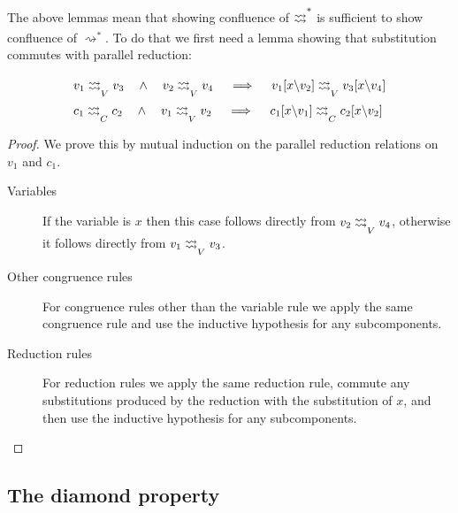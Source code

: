 \documentclass[acmsmall, screen, review, anonymous]{acmart}
\makeatletter
\theoremstyle{definition}
\newcommand{\sub}[2]{[#1\backslash#2]}
\newcommand{\sbst}[3]{#1\sub{#2}{#3}}
\newcommand{\stepstoname}{\rightsquigarrow}
\newcommand{\reducestoname}{\stepstoname^{*}}
\newcommand{\drightsquigarrow}{\begin{array}{@{}c@{}}\rightsquigarrow \\[-8pt] \rightsquigarrow\end{array}}
\newcommand{\parastepstoname}{\drightsquigarrow}
\newcommand{\parastepstov}{\mathrel{\parastepstoname_{V}}}
\newcommand{\parastepstoc}{\mathrel{\parastepstoname_{C}}}
\newcommand{\parareducestoname}{\parastepstoname^{*}}
\makeatother
\begin{document}
The above lemmas mean that showing confluence of $\parareducestoname$ is
sufficient to show confluence of $\reducestoname$. To do that we first
need a lemma showing that substitution commutes with parallel reduction:
\begin{lemma}
\label{lemma:subst-of-parallel-reduction}
  \begin{align*}
  &v_1 \parastepstov v_3
    \quad \wedge \quad v_2 \parastepstov v_4
    \quad \implies \quad \sbst{v_1}{x}{v_2} \parastepstov \sbst{v_3}{x}{v_4} \\
  &c_1 \parastepstoc c_2
    \quad \wedge \quad v_1 \parastepstov v_2
    \quad \implies \quad \sbst{c_1}{x}{v_1} \parastepstoc \sbst{c_2}{x}{v_2}
  \end{align*}
\end{lemma}
\begin{proof}
We prove this by mutual induction on the parallel reduction relations on
$v_1$ and $c_1$.
\begin{description}
\item[Variables]
  If the variable is $x$ then this case follows directly from $v_2 \parastepstov v_4$,
  otherwise it follows directly from $v_1 \parastepstov v_3$.
\item[Other congruence rules] For congruence rules other than the
  variable rule we apply the same congruence rule and use the inductive
  hypothesis for any subcomponents.
\item[Reduction rules] For reduction rules we apply the same reduction
  rule, commute any substitutions produced by the reduction with the
  substitution of $x$, and then use the inductive hypothesis for any
  subcomponents.
\end{description}
\end{proof}

\subsection{The diamond property}
\end{document}
